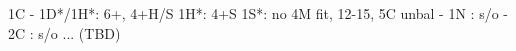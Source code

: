 1C - 1D*/1H*: 6+, 4+H/S
1H*: 4+S
1S*: no 4M fit, 12-15, 5C unbal
   - 1N : s/o
   - 2C : s/o
... (TBD)